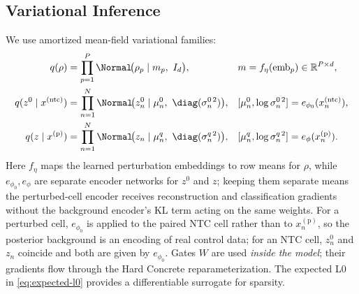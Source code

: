 \subsection{Variational Inference}
We use amortized mean-field variational families:
\begin{align}
  q(\rho) &= \prod_{p=1}^P \Normal\!\big(\rho_p \mid m_p,\ I_d\big),
  && m = f_\eta(\text{emb}_p)\in\mathbb{R}^{P\times d},\\
  q(z^0 \mid x^{(\mathrm{ntc})}) &= \prod_{n=1}^N \Normal\!\big(z^0_n \mid \mu^0_n,\ \diag(\sigma^{0\,2}_n)\big),
  && [\mu^0_n,\log\sigma^{0\,2}_n] = e_{\phi_0}(x^{(\mathrm{ntc})}_n),\\
  q(z \mid x^{(\mathrm{p})}) &= \prod_{n=1}^N \Normal\!\big(z_n \mid \mu_n^q,\ \diag(\sigma^{q\,2}_n)\big),
  && [\mu^q_n,\log\sigma^{q\,2}_n] = e_{\phi}(x^{(\mathrm{p})}_n).
\end{align}
Here $f_\eta$ maps the learned perturbation embeddings to row means for $\rho$, while
$e_{\phi_0},e_\phi$ are separate encoder networks for $z^0$ and $z$; keeping them separate means the
perturbed-cell encoder receives reconstruction and classification gradients without the background
encoder's KL term acting on the same weights. For a perturbed cell, $e_{\phi_0}$ is applied to the
paired NTC cell rather than to $x^{(\mathrm{p})}_n$, so the posterior background is an encoding of
real control data; for an NTC cell, $z^0_n$ and $z_n$ coincide and both are given by $e_{\phi_0}$.
Gates $W$ are used \emph{inside the model}; their gradients flow through the Hard Concrete
reparameterization. The expected L0 in \eqref{eq:expected-l0} provides a differentiable surrogate for
sparsity.

